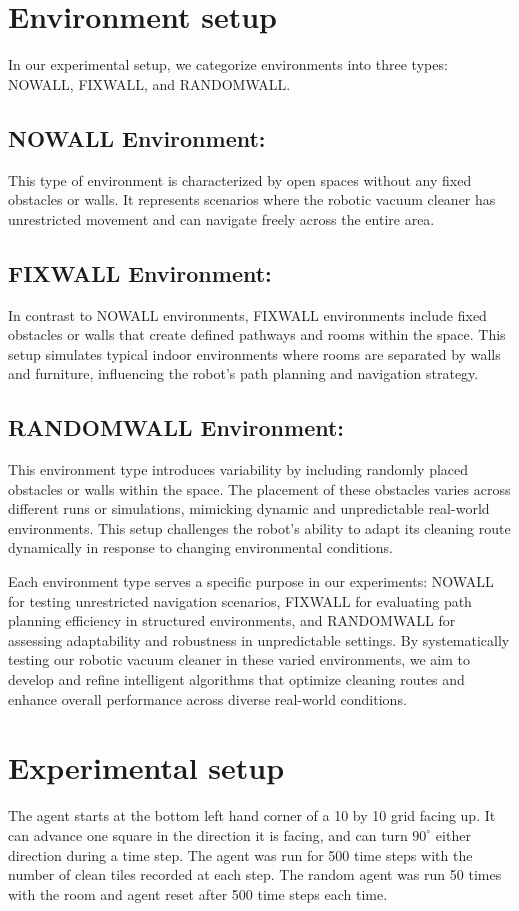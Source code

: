 \documentclass{article}
\begin{document}
\section{Environment setup}
In our experimental setup, we categorize environments into three types: NOWALL, FIXWALL, and RANDOMWALL.

\subsection{NOWALL Environment:} This type of environment is characterized by open spaces without any fixed obstacles or walls. It represents scenarios where the robotic vacuum cleaner has unrestricted movement and can navigate freely across the entire area.

\subsection{FIXWALL Environment:} In contrast to NOWALL environments, FIXWALL environments include fixed obstacles or walls that create defined pathways and rooms within the space. This setup simulates typical indoor environments where rooms are separated by walls and furniture, influencing the robot's path planning and navigation strategy.

\subsection{RANDOMWALL Environment:} This environment type introduces variability by including randomly placed obstacles or walls within the space. The placement of these obstacles varies across different runs or simulations, mimicking dynamic and unpredictable real-world environments. This setup challenges the robot's ability to adapt its cleaning route dynamically in response to changing environmental conditions.


Each environment type serves a specific purpose in our experiments: NOWALL for testing unrestricted navigation scenarios, FIXWALL for evaluating path planning efficiency in structured environments, and RANDOMWALL for assessing adaptability and robustness in unpredictable settings. By systematically testing our robotic vacuum cleaner in these varied environments, we aim to develop and refine intelligent algorithms that optimize cleaning routes and enhance overall performance across diverse real-world conditions.
\section{Experimental setup}
The agent starts at the bottom left hand corner of a 10 by 10 grid facing up. It can advance one square in the direction it is facing, and can turn $90^\circ$ either direction during a time step. The agent was run for 500 time steps with the number of clean tiles recorded at each step. The random agent was run 50 times with the room and agent reset after 500 time steps each time.
\end{document}
